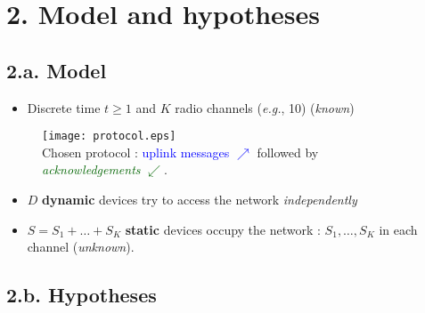 \section{\hfill{}2. Model and hypotheses\hfill{}}

\subsection{\hfill{}2.a. Model\hfill{}}

\begin{frameO}[Model]

    \begin{itemize}\tightlist
        \item
              Discrete time \(t\geq1\) and \(K\) radio channels (\emph{e.g.}, 10)
              \hfill{} (\emph{known})
    \end{itemize}

    \begin{figure}[h!]
        \centering
        \texttt{[image: protocol.eps]}\\
        {\small Chosen protocol : \textcolor{blue}{uplink messages $\nearrow$} followed by \textcolor{darkgreen}{\emph{acknowledgements} $\swarrow$}.}
    \end{figure}

    \begin{itemize}\tightlist
        \item
              \(D\) \textbf{dynamic} devices try to access the network
              \emph{independently}
        \item
              \(S=S_1+\dots+S_{K}\) \textbf{static} devices occupy the network :
              \newline
              \(S_1,\dots,S_{K}\) in each channel \hfill{} (\emph{unknown}).
    \end{itemize}

\end{frameO}



\subsection{\hfill{}2.b. Hypotheses\hfill{}}

